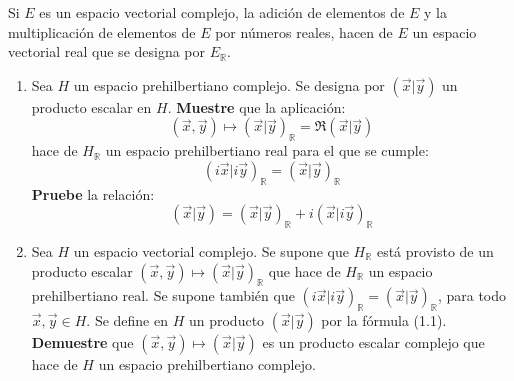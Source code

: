 \documentclass[12pt]{report}
\theoremstyle{largebreak}
\newcommand\pint[2]{\ensuremath{\left(#1\big|#2\right)}}
\begin{document}
    \begin{excer}
        Si $E$ es un espacio vectorial complejo, la adición de elementos de $E$ y la multiplicación de elementos de $E$ por números reales, hacen de $E$ un espacio vectorial real que se designa por $E_\mathbb{R}$.
        \begin{enumerate}
            \item Sea $H$ un espacio prehilbertiano complejo. Se designa por $\pint{\vec{x}}{\vec{y}}$ un producto escalar en $H$. \textbf{Muestre} que la aplicación:
            \begin{equation*}
                (\vec{x},\vec{y})\mapsto\pint{\vec{x}}{\vec{y}}_\mathbb{R}=\Re\pint{\vec{x}}{\vec{y}}
            \end{equation*}
            hace de $H_\mathbb{R}$ un espacio prehilbertiano real para el que se cumple:
            \begin{equation*}
                \pint{i\vec{x}}{i\vec{y}}_\mathbb{R}=\pint{\vec{x}}{\vec{y}}_\mathbb{R}
            \end{equation*}
            \textbf{Pruebe} la relación:
            \begin{equation}
                \pint{\vec{x}}{\vec{y}}=\pint{\vec{x}}{\vec{y}}_\mathbb{R}+i\pint{\vec{x}}{i\vec{y}}_\mathbb{R}
            \end{equation}
            \item Sea $H$ un espacio vectorial complejo. Se supone que $H_\mathbb{R}$ está provisto de un producto escalar $(\vec{x},\vec{y})\mapsto\pint{\vec{x}}{\vec{y}}_\mathbb{R}$ que hace de $H_\mathbb{R}$ un espacio prehilbertiano real. Se supone también que $\pint{i\vec{x}}{i\vec{y}}_\mathbb{R}=\pint{\vec{x}}{\vec{y}}_\mathbb{R}$, para todo $\vec{x},\vec{y}\in H$. Se define en $H$ un producto $\pint{\vec{x}}{\vec{y}}$ por la fórmula (1.1). \textbf{Demuestre} que $(\vec{x},\vec{y})\mapsto\pint{\vec{x}}{\vec{y}}$ es un producto escalar complejo que hace de $H$ un espacio prehilbertiano complejo. 
        \end{enumerate}
    \end{excer}
\end{document}
